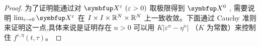 \begin{proof}
为了证明能通过对 $\vect{X}^\varepsilon ~(\varepsilon>0)$ 取极限得到 $\vect{X}^0$ , 需要说明 $\lim_{\varepsilon\rightarrow 0} \vect{X}^\varepsilon$ 在 $I\times I \times {\mathbb{R}}^N \times {\mathbb{R}}^N$ 上一致收敛。下面通过 Cauchy 准则来证明这一点,具体来说是证明存在 $n>0$ 可以用 $K |\varepsilon^{n} -\eta^n|$ （$K$ 为常数）来控制住 $f^{\varepsilon, \eta}(t, \tau)$。







\end{proof}
